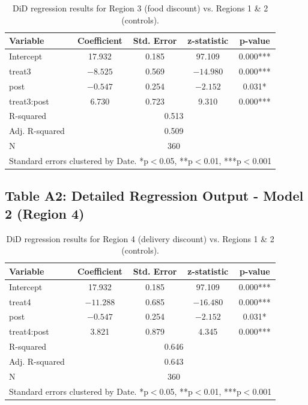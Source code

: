 \documentclass[12pt]{article}
\begin{document}
\begin{table}[H]
\centering
\small
\begin{tabular}{lcccc}
\toprule
\textbf{Variable} & \textbf{Coefficient} & \textbf{Std. Error} & \textbf{z-statistic} & \textbf{p-value} \\
\midrule
Intercept & 17.932 & 0.185 & 97.109 & 0.000*** \\
treat3 & $-8.525$ & 0.569 & $-14.980$ & 0.000*** \\
post & $-0.547$ & 0.254 & $-2.152$ & 0.031* \\
treat3:post & 6.730 & 0.723 & 9.310 & 0.000*** \\
\midrule
R-squared & \multicolumn{4}{c}{0.513} \\
Adj. R-squared & \multicolumn{4}{c}{0.509} \\
N & \multicolumn{4}{c}{360} \\
\bottomrule
\multicolumn{5}{l}{\footnotesize Standard errors clustered by Date. *p$<$0.05, **p$<$0.01, ***p$<$0.001}
\end{tabular}
\caption{DiD regression results for Region 3 (food discount) vs. Regions 1 \& 2 (controls).}
\label{tab:reg_r3}
\end{table}

\subsection{Table A2: Detailed Regression Output - Model 2 (Region 4)}

\begin{table}[H]
\centering
\small
\begin{tabular}{lcccc}
\toprule
\textbf{Variable} & \textbf{Coefficient} & \textbf{Std. Error} & \textbf{z-statistic} & \textbf{p-value} \\
\midrule
Intercept & 17.932 & 0.185 & 97.109 & 0.000*** \\
treat4 & $-11.288$ & 0.685 & $-16.480$ & 0.000*** \\
post & $-0.547$ & 0.254 & $-2.152$ & 0.031* \\
treat4:post & 3.821 & 0.879 & 4.345 & 0.000*** \\
\midrule
R-squared & \multicolumn{4}{c}{0.646} \\
Adj. R-squared & \multicolumn{4}{c}{0.643} \\
N & \multicolumn{4}{c}{360} \\
\bottomrule
\multicolumn{5}{l}{\footnotesize Standard errors clustered by Date. *p$<$0.05, **p$<$0.01, ***p$<$0.001}
\end{tabular}
\caption{DiD regression results for Region 4 (delivery discount) vs. Regions 1 \& 2 (controls).}
\label{tab:reg_r4}
\end{table}
\end{document}
